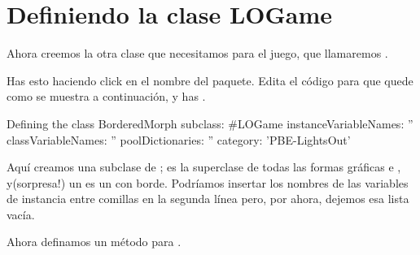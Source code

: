 \documentclass[a4paper,10pt,twoside]{book}
\begin{document}

\section{Definiendo la clase LOGame}

Ahora creemos la otra clase que necesitamos para el juego, que llamaremos .


Has esto haciendo click en el nombre del paquete.
Edita el c\'odigo para que quede como se muestra a continuaci\'on, y has .

\begin{classdef}[sbegame]{Defining the  class}
BorderedMorph subclass: #LOGame
   instanceVariableNames: ''
   classVariableNames: ''
   poolDictionaries: ''
   category: 'PBE-LightsOut'
\end{classdef}


Aqu\'i creamos una subclase de ;  es la superclase de todas las formas gr\'aficas e \pharo, y(sorpresa!) un  es un  con borde.
Podr\'iamos insertar los nombres de las variables de instancia entre comillas en la segunda l\'inea pero, por ahora, dejemos esa lista vac\'ia.

Ahora definamos un m\'etodo  para .
\end{document}
